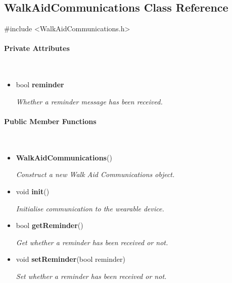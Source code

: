 \subsection{WalkAidCommunications Class Reference}
\label{subsec:WalkAidCommunications}\mbox{}

    \ttfamily{}

    \#include <WalkAidCommunications.h>\\

    \rmfamily{}

    \paragraph{Private Attributes}\mbox{}\\

        \begin{itemize}
            \item bool \textbf{reminder}
            
                \quad \quad \textit{Whether a reminder message has been received.}\\

        \end{itemize}


    \paragraph{Public Member Functions}\mbox{}\\

        \begin{itemize}
            \item \textbf{WalkAidCommunications}() 
            
                \quad \quad \textit{Construct a new Walk Aid Communications object.}

            \item void \textbf{init}()
            
                \quad \quad \textit{Initialise communication to the wearable device.}

            \item bool \textbf{getReminder}() 
            
                \quad \quad \textit{Get whether a reminder has been received or not.}
                
            \item void \textbf{setReminder}(bool reminder) 
            
                \quad \quad \textit{Set whether a reminder has been received or not.}\\

        \end{itemize}

